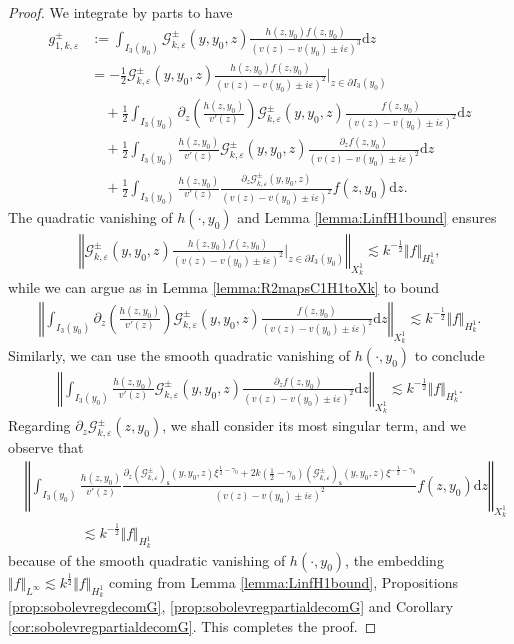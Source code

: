\documentclass[11pt,reqno]{amsproc}
\theoremstyle{definition}
\numberwithin{equation}{section}
\newcommand{\G}{{\mathcal{G}}}
\newcommand{\s}{{\mathsf{s}}}
\renewcommand{\d}{\mathrm{d}}
\newcommand{\ep}{\varepsilon}
\begin{document}
\begin{proof}
We integrate by parts to have
\begin{align*}
g_{1,k,\ep}^\pm &:= \int_{I_3(y_0)}\G_{k,\ep}^\pm(y,y_0,z)\frac{h(z,y_0)f(z,y_0)}{(v(z) - v(y_0) \pm i\ep)^3} \d z \\
&= -\frac12 \G_{k,\ep}^\pm(y,y_0,z)\frac{h(z,y_0)f(z,y_0)}{(v(z) - v(y_0) \pm i\ep)^2}\Big|_{z\in \partial I_3(y_0)} \\
&\quad + \frac12 \int_{I_3(y_0)} \partial_z \left( \frac{h(z,y_0)}{v'(z)}\right)\G_{k,\ep}^\pm (y,y_0,z)\frac{f(z,y_0)}{(v(z) - v(y_0) \pm i\ep)^2}\d z \\
&\quad + \frac12 \int_{I_3(y_0)} \frac{h(z,y_0)}{v'(z)} \G_{k,\ep}^\pm(y,y_0,z)\frac{\partial_z f(z,y_0)}{(v(z) - v(y_0) \pm i\ep)^2} \d z\\
&\quad +\frac12 \int_{I_3(y_0)}\frac{h(z,y_0)}{v'(z)} \frac{\partial_z \G_{k,\ep}^\pm(y,y_0,z)}{(v(z) - v(y_0) \pm i\ep)^2}f(z,y_0) \d z.
\end{align*}
The quadratic vanishing of $h(\cdot, y_0)$ and Lemma \ref{lemma:LinfH1bound} ensures
\begin{align*}
\left \Vert \G_{k,\ep}^\pm(y,y_0,z)\frac{h(z,y_0)f(z,y_0)}{(v(z) - v(y_0) \pm i\ep)^2}\Big|_{z\in \partial I_3(y_0)} \right\Vert_{X_k^1}\lesssim k^{-\frac12}\Vert f \Vert_{H_k^1},
\end{align*}
while we can argue as in Lemma \ref{lemma:R2mapsC1H1toXk} to bound
\begin{align*}
\left \Vert  \int_{I_3(y_0)} \partial_z \left( \frac{h(z,y_0)}{v'(z)}\right)\G_{k,\ep}^\pm (y,y_0,z)\frac{f(z,y_0)}{(v(z) - v(y_0) \pm i\ep)^2}\d z \right\Vert_{X_k^1} \lesssim k^{-\frac12}\Vert f \Vert_{H_k^1}.
\end{align*}
Similarly, we can use the smooth quadratic vanishing of $h(\cdot,y_0)$ to conclude 
\begin{align*}
\left \Vert  \int_{I_3(y_0)} \frac{h(z,y_0)}{v'(z)} \G_{k,\ep}^\pm(y,y_0,z)\frac{\partial_z f(z,y_0)}{(v(z) - v(y_0) \pm i\ep)^2} \d z \right\Vert_{X_k^1} \lesssim k^{-\frac12}\Vert f \Vert_{H_k^1}.
\end{align*}
Regarding $\partial_z\G_{k,\ep}^\pm(z,y_0)$, we shall consider its most singular term, and we observe that
\begin{align*}
&\left \Vert \int_{I_3(y_0)} \frac{h(z,y_0)}{v'(z)} \frac{\partial_z \left(\G_{k,\ep}^\pm\right)_\s(y,y_0,z) \xi^{\frac12-\gamma_0} + 2k(\tfrac12-\gamma_0)\left( \G_{k,\ep}^\pm\right)_\s(y,y_0,z) \xi^{-\frac12-\gamma_0}}{(v(z) - v(y_0) \pm i\ep)^2}f(z,y_0) \d z \right\Vert_{X_k^1} \\
&\qquad\qquad \lesssim k^{-\frac12}\Vert f\Vert_{H_k^1}
\end{align*}
because of the smooth quadratic vanishing of $h(\cdot, y_0)$, the embedding $\Vert f \Vert_{L^\infty}\lesssim k^\frac12\Vert f \Vert_{H_k^1}$ coming from Lemma \ref{lemma:LinfH1bound},  Propositions \ref{prop:sobolevregdecomG}, \ref{prop:sobolevregpartialdecomG} and Corollary \ref{cor:sobolevregpartialdecomG}.  This completes the proof.
\end{proof}
\end{document}
